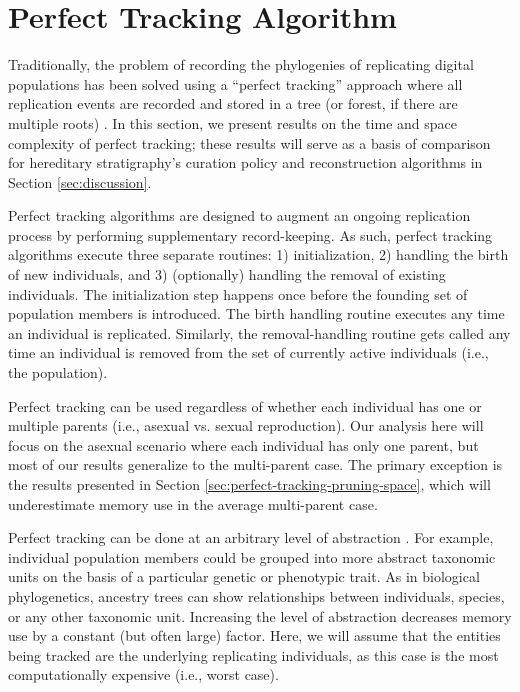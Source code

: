 \section{Perfect Tracking Algorithm} \label{sec:perfect-tracking-algorithm}

Traditionally, the problem of recording the phylogenies of replicating digital populations has been solved using a ``perfect tracking'' approach where all replication events are recorded and stored in a tree (or forest, if there are multiple roots) \citep{dolson2024phylotrack}.
In this section, we present results on the time and space complexity of perfect tracking;
these results will serve as a basis of comparison for hereditary stratigraphy's curation policy and reconstruction algorithms in Section \ref{sec:discussion}.

Perfect tracking algorithms are designed to augment an ongoing replication process by performing supplementary record-keeping.
As such, perfect tracking algorithms execute three separate routines: 1) initialization, 2) handling the birth of new individuals, and 3) (optionally) handling the removal of existing individuals.
The initialization step happens once before the founding set of population members is introduced.
The birth handling routine executes any time an individual is replicated.
Similarly, the removal-handling routine gets called any time an individual is removed from the set of currently active individuals (i.e., the population).

Perfect tracking can be used regardless of whether each individual has one or multiple parents (i.e., asexual vs. sexual reproduction).
Our analysis here will focus on the asexual scenario where each individual has only one parent, but most of our results generalize to the multi-parent case.
The primary exception is the results presented in Section \ref{sec:perfect-tracking-pruning-space}, which will underestimate memory use in the average multi-parent case.

Perfect tracking can be done at an arbitrary level of abstraction \citep{dolson2020interpreting}.%
For example, individual population members could be grouped into more abstract taxonomic units on the basis of a particular genetic or phenotypic trait.
As in biological phylogenetics, ancestry trees can show relationships between individuals, species, or any other taxonomic unit.
Increasing the level of abstraction decreases memory use by a constant (but often large) factor.
Here, we will assume that the entities being tracked are the underlying replicating individuals, as this case is the most computationally expensive (i.e., worst case).

